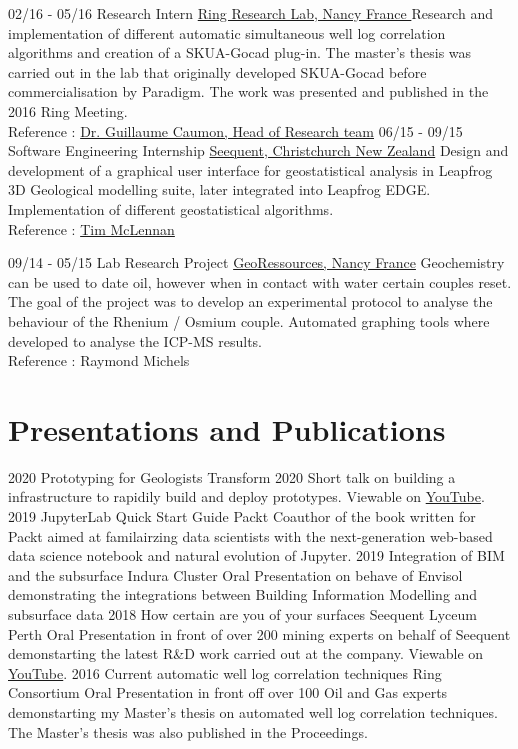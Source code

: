 \documentclass[]{friggeri-cv}
\begin{document}
    \vspace*{\fill}
    \begin{entrylist}
    \entry
    {02/16 - 05/16}
    {Research Intern}
    {\href{http://www.ring-team.org/}{Ring Research Lab, Nancy France }}
    {Research and implementation of different automatic simultaneous well log correlation algorithms and creation of a SKUA-Gocad plug-in. The master's thesis was carried out in the lab that originally developed SKUA-Gocad before commercialisation by Paradigm. The work was presented and published in the 2016 Ring Meeting. \\Reference : \href{mailto:Guillaume.Caumon@ensg.univ-lorraine.fr}{Dr. Guillaume Caumon, Head of Research team}}
    \entry
    {06/15 - 09/15}
    {Software Engineering Internship}
    {\href{https://www.seequent.com/}{Seequent, Christchurch New Zealand}}
    {Design and development of a graphical user interface for geostatistical analysis in Leapfrog 3D Geological modelling suite, later integrated into Leapfrog EDGE. Implementation of different geostatistical algorithms.
    \\
    Reference : \href{mailto:tim.mclennan@seequent.com}{Tim McLennan}}

	\entry
	{09/14 - 05/15}
	{Lab Research Project}
	{\href{http://georessources.univ-lorraine.fr/}{GeoRessources, Nancy France}}
	{Geochemistry can be used to date oil, however when in contact with water certain couples reset. The goal of the project was to develop an experimental protocol to analyse the behaviour of the Rhenium / Osmium couple. Automated graphing tools where developed to analyse the ICP-MS results.
		\\
		Reference : Raymond Michels}
\end{entrylist}
\section{Presentations and Publications}
\begin{entrylist}
	\entry
	{2020}
	{Prototyping for Geologists}
	{Transform 2020}
	{Short talk on building a infrastructure to rapidily build and deploy prototypes.
	Viewable on \href{https://youtu.be/rUbvueIF5f8?t=4130}{YouTube}.}
	\entry
	{2019}
	{JupyterLab Quick Start Guide}
	{Packt}
	{Coauthor of the book written for Packt aimed at familairzing data scientists with the next-generation web-based data science notebook and natural evolution of Jupyter. }
	\entry
	{2019}
	{Integration of BIM and the subsurface}
	{Indura Cluster}
	{Oral Presentation on behave of Envisol demonstrating the integrations between Building Information Modelling and subsurface data}
	\entry
	{2018}
	{How certain are you of your surfaces}
	{Seequent Lyceum Perth}
	{Oral Presentation in front of over 200 mining experts on behalf of Seequent demonstarting the latest R\&D work carried out at the company. Viewable on \href{https://www.youtube.com/watch?v=jt26J5ljlA0}{YouTube}.}
	\entry
	{2016}
	{Current automatic well log correlation techniques}
	{Ring Consortium}
	{Oral Presentation in front off over 100 Oil and Gas experts demonstarting my Master's thesis on automated well log correlation techniques. The Master's thesis was also published in the Proceedings.}
\end{entrylist}
\end{document}
